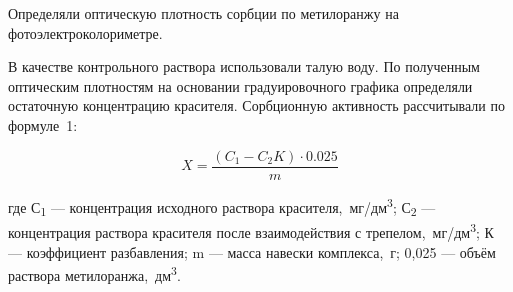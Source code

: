\begin{multicols}{2}
Определяли оптическую плотность сорбции по метилоранжу на
фотоэлектроколориметре.

В качестве контрольного раствора использовали талую воду. По полученным
оптическим плотностям на основании градуировочного графика определяли
остаточную концентрацию красителя. Сорбционную активность рассчитывали
по формуле~1:

\begin{equation}
X=\frac{(C_1-C_2K)\cdot 0.025}{m}
\end{equation}

где С\textsubscript{1} --- концентрация исходного раствора
красителя,~мг/дм\textsuperscript{3}; С\textsubscript{2} --- концентрация
раствора красителя после взаимодействия с
трепелом,~мг/дм\textsuperscript{3}; К --- коэффициент разбавления; m ---
масса навески комплекса,~г; 0,025 --- объём раствора
метилоранжа,~дм\textsuperscript{3}.
\end{multicols}

